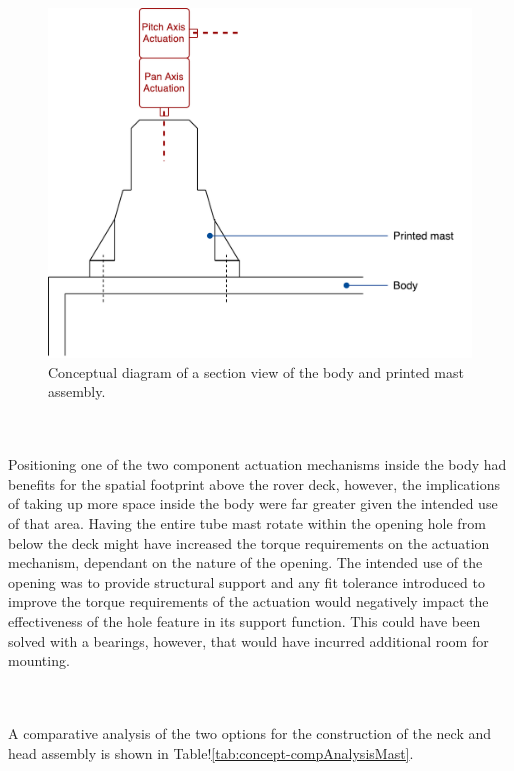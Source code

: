 \begin{itemize}
        \begin{figure}[H]
          \centering
          \includegraphics[width=0.7\linewidth]{figures/concepts-printedMast}
          \caption[Conceptual diagram of a section view of the body and printed mast assembly.]{Conceptual diagram of a section view of the body and printed mast assembly.}
          \label{fig:concepts-printedMast}
        \end{figure}
        
      \end{itemize}
      
      \\\\
        Positioning one of the two component actuation mechanisms inside the body had benefits for the spatial footprint above the rover deck, however, the implications of taking up more space inside the body were far greater given the intended use of that area. Having the entire tube mast rotate within the opening hole from below the deck might have increased the torque requirements on the actuation mechanism, dependant on the nature of the opening. The intended use of the opening was to provide structural support and any fit tolerance introduced to improve the torque requirements of the actuation would negatively impact the effectiveness of the hole feature in its support function. This could have been solved with a bearings, however, that would have incurred additional room for mounting.
      
      \\\\
      A comparative analysis of the two options for the construction of the neck and head assembly is shown in Table!\ref{tab:concept-compAnalysisMast}.
      

